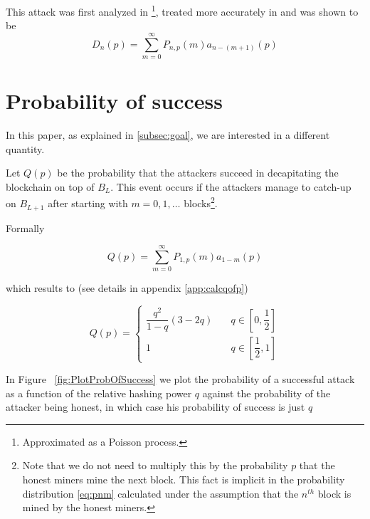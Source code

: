 \documentclass[letterpaper,12pt]{report}
\theoremstyle{plain}
\theoremstyle{definition}
\begin{document}
This attack was first analyzed in \cite{Bitcoin}\footnote{Approximated as a Poisson process.}, treated more accurately in \cite{Doublespend} and was shown to be 
\begin{equation}
D_n(p)=\sum_{m=0}^{\infty}P_{n,p}(m)\mathit{a}_{n-(m+1)}(p)
\end{equation}

\section{Probability of success}

In this paper, as explained in \ref{subsec:goal}, we are interested in a different quantity.

Let $\mathit{Q}(p)$  be the probability that the attackers succeed in decapitating the blockchain on top of $\mathit{B}_L$. This event occurs if the attackers manage to catch-up on $B_{L+1}$ after starting with $m=0,1,\dots$ blocks\footnote{Note that we do not need to multiply this by the probability $p$ that the honest miners mine the next block. This fact is implicit in the probability distribution \ref{eq:pnm} calculated under the assumption that the $n^{th}$ block is mined by the honest miners.}.

Formally 

\begin{equation}\label{eq:rnpdef}
\mathit{Q}(p)=\sum_{m=0}^{\infty}\mathit{P}_{1,p}(m)\mathit{a}_{1-m}(p)
\end{equation}

which results to (see details in appendix \ref{app:calcqofp})

\begin{equation}\label{eq:qofp}
\mathit{Q}(p)=
\begin{cases}
\dfrac{q^2}{1-q}\left(
3-2q
\right) & \quad q \in [0,\dfrac{1}{2}] \\
1 & \quad q \in [\dfrac{1}{2},1] 
\end{cases}
\end{equation}


In Figure ~\ref{fig:PlotProbOfSuccess} we plot the probability of a successful attack as a function of the relative hashing power $q$ against the probability of the attacker being honest, in which case his probability of success is just $q$
\end{document}
